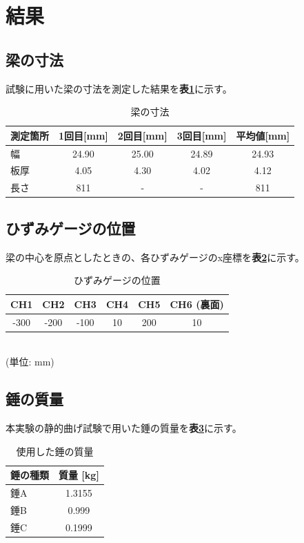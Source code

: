 \documentclass[a4j]{jarticle}
\begin{document}
\section{結果}

\subsection{梁の寸法}
試験に用いた梁の寸法を測定した結果を\textbf{表\ref{tab:beam_dim}}に示す。
\begin{table}[H]
  \centering
  \caption{梁の寸法}
  \label{tab:beam_dim}
  \begin{tabular}{|l|c|c|c|c|}
    \hline
    測定箇所 & 1回目[mm] & 2回目[mm] & 3回目[mm] & 平均値[mm] \\ \hline
    幅 & 24.90 & 25.00 & 24.89 & 24.93 \\ \hline
    板厚 & 4.05 & 4.30 & 4.02 & 4.12 \\ \hline
    長さ & 811 & - & - & 811 \\ \hline
  \end{tabular}
\end{table}

\subsection{ひずみゲージの位置}
梁の中心を原点としたときの、各ひずみゲージのx座標を\textbf{表\ref{tab:gauge_pos}}に示す。
\begin{table}[H]
  \centering
  \caption{ひずみゲージの位置}
  \label{tab:gauge_pos}
  \begin{tabular}{|c|c|c|c|c|c|}
    \hline
    CH1 & CH2 & CH3 & CH4 & CH5 & CH6 (裏面) \\ \hline
    -300 & -200 & -100 & 10 & 200 & 10 \\ \hline
  \end{tabular}
  \\(単位: mm)
\end{table}

\subsection{錘の質量}
\label{tex:omori}
本実験の静的曲げ試験で用いた錘の質量を\textbf{表\ref{tab:weights}}に示す。
\begin{table}[H]
    \centering
    \caption{使用した錘の質量}
    \label{tab:weights}
    \begin{tabular}{|l|c|}
        \hline
        錘の種類 & 質量 [kg] \\ \hline
        錘A & 1.3155 \\ \hline
        錘B & 0.999 \\ \hline
        錘C & 0.1999 \\ \hline
    \end{tabular}
\end{table}
\end{document}
